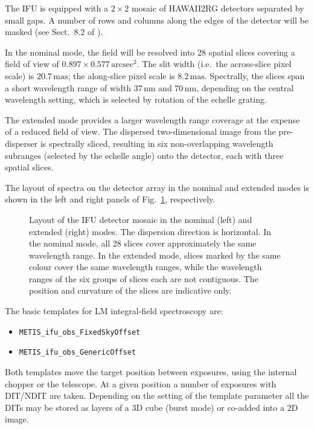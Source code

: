 The IFU is equipped with a $2\times2$ mosaic of HAWAII2RG detectors
separated by small gaps. A number of rows and columns along the edges
of the detector will be masked (see Sect.~8.2 of \cite{DRLS}).

In the nominal mode, the field will be resolved into 28 spatial slices
covering a field of view of $0.897\times0.577\,\mathrm{arcsec^{2}}$.
The slit width (i.e.\ the across-slice pixel scale) is
$20.7\,\mathrm{mas}$; the along-slice pixel scale is
$8.2\,\mathrm{mas}$. Spectrally, the slices span a short wavelength
range of width $37\,\mathrm{nm}$ and $70\,\mathrm{nm}$, depending on
the central wavelength setting, which is selected by rotation of the
echelle grating.

The extended mode provides a larger wavelength range coverage at the
expense of a reduced field of view. The dispersed two-dimensional
image from the pre-disperser is spectrally sliced, resulting in six
non-overlapping wavelength subranges (selected by the echelle angle)
onto the detector, each with three spatial slices.

The layout of spectra on the detector array in the nominal and
extended modes is shown in the left and right panels of
Fig.~\ref{fig:IFU_detector_layout}, respectively.

\begin{figure}[ht]
  \centering
  \hfill
  \caption[IFU detector layout]{Layout of the IFU detector mosaic
    in the nominal (left) and extended (right) modes. The dispersion
    direction is horizontal. In the nominal mode, all 28 slices cover
    approximately the same wavelength range. In the extended mode, slices marked by
    the same colour cover the same wavelength ranges, while the
    wavelength ranges of the six groups of slices each are not
    contiguous. The position and curvature of the slices are
    indicative only. }
  \label{fig:IFU_detector_layout}
\end{figure}

The basic templates for LM integral-field spectroscopy are:
\begin{itemize}
\item \lstinline{METIS_ifu_obs_FixedSkyOffset}
\item \lstinline{METIS_ifu_obs_GenericOffset}
\end{itemize}
Both templates move the target position between exposures, using the
internal chopper or the telescope. At a given position a number of
exposures with DIT/NDIT are taken. Depending on the setting of the
template parameter  all the DITs may be stored as
layers of a 3D cube (burst mode) or co-added into a 2D image.

